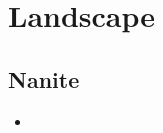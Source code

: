 \chapter{Landscape}
    \section{Nanite}
        \begin{itemize}
            \item 
        \end{itemize}